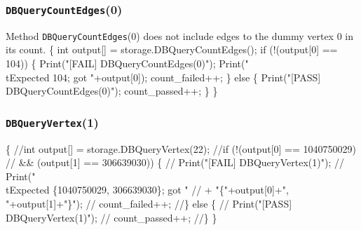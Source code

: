 \documentclass{article}
\def\nwendcode{\endtrivlist \endgroup}
\let\nwdocspar=\par
\begin{document}
\subsubsection{{\tt{}DBQueryCountEdges}(0)}
Method {\tt{}DBQueryCountEdges}(0) does not include edges to the dummy vertex 0 in
its count.
\nwenddocs{}\endmoddef{}
\{
  int output[] = storage.DBQueryCountEdges();
  if (!(output[0] == 104)) \{
    Print("[FAIL] DBQueryCountEdges(0)");
    Print("\\tExpected 104; got "+output[0]);
    count_failed++;
  \} else \{
    Print("[PASS] DBQueryCountEdges(0)");
    count_passed++;
  \}
\}
\nwendcode{}\nwdocspar
\subsubsection{{\tt{}DBQueryVertex}(1)}
\nwenddocs{}\endmoddef{}
\{
  //int output[] = storage.DBQueryVertex(22);
  //if (!(output[0] == 1040750029)
  //  && (output[1] == 306639030)) \{
  //  Print("[FAIL] DBQueryVertex(1)");
  //  Print("\\tExpected \{1040750029, 306639030\}; got "
  //    + "\{"+output[0]+", "+output[1]+"\}");
  //  count_failed++;
  //\} else \{
  //  Print("[PASS] DBQueryVertex(1)");
  //  count_passed++;
  //\}
\}
\nwendcode{}\nwdocspar
\end{document}

